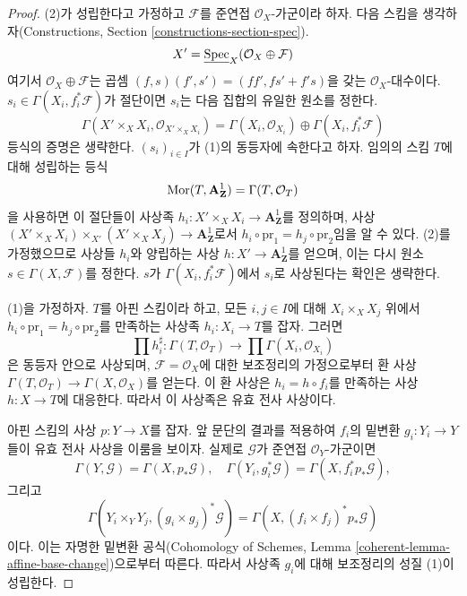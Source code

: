 \begin{proof}
(2)가 성립한다고 가정하고 $\mathcal{F}$를 준연접
$\mathcal{O}_X$-가군이라 하자. 다음 스킴을 생각하자(Constructions, Section
\ref{constructions-section-spec}).
$$
X' = \underline{\mathop{\mathrm{Spec}}}_X(\mathcal{O}_X \oplus \mathcal{F})
$$
여기서 $\mathcal{O}_X \oplus \mathcal{F}$는 곱셈
$(f, s)(f', s') = (ff', fs' + f's)$을 갖는
$\mathcal{O}_X$-대수이다.
$s_i \in \Gamma(X_i, f_i^*\mathcal{F})$가 절단이면 $s_i$는 다음 집합의
유일한 원소를 정한다.
$$
\Gamma(X' \times_X X_i, \mathcal{O}_{X' \times_X X_i}) =
\Gamma(X_i, \mathcal{O}_{X_i}) \oplus \Gamma(X_i, f_i^*\mathcal{F})
$$
등식의 증명은 생략한다.
$(s_i)_{i \in I}$가 (1)의 동등자에 속한다고 하자. 임의의 스킴 $T$에 대해
성립하는 등식
$$
\mathop{\mathrm{Mor}}\nolimits(T, \mathbf{A}^1_\mathbf{Z}) = \Gamma(T, \mathcal{O}_T)
$$
을 사용하면 이 절단들이 사상족
$h_i : X' \times_X X_i \to \mathbf{A}^1_\mathbf{Z}$를 정의하며,
사상 $(X' \times_X X_i) \times_{X'} (X' \times_X X_j) \to
\mathbf{A}^1_\mathbf{Z}$로서
$h_i \circ \text{pr}_1 = h_j \circ \text{pr}_2$임을 알 수 있다.
(2)를 가정했으므로 사상들 $h_i$와 양립하는 사상
$h : X' \to \mathbf{A}^1_\mathbf{Z}$를 얻으며, 이는 다시 원소
$s \in \Gamma(X, \mathcal{F})$를 정한다. $s$가
$\Gamma(X_i, f_i^*\mathcal{F})$에서 $s_i$로 사상된다는 확인은 생략한다.

\medskip\noindent
(1)을 가정하자. $T$를 아핀 스킴이라 하고, 모든 $i, j \in I$에 대해
$X_i \times_X X_j$ 위에서
$h_i \circ \text{pr}_1 = h_j \circ \text{pr}_2$를 만족하는 사상족
$h_i : X_i \to T$를 잡자. 그러면
$$
\prod h_i^\sharp :
\Gamma(T, \mathcal{O}_T)
\to
\prod \Gamma(X_i, \mathcal{O}_{X_i})
$$
은 동등자 안으로 사상되며, $\mathcal{F} = \mathcal{O}_X$에 대한 보조정리의
가정으로부터 환 사상
$\Gamma(T, \mathcal{O}_T) \to \Gamma(X, \mathcal{O}_X)$를 얻는다.
이 환 사상은 $h_i = h \circ f_i$를 만족하는 사상 $h : X \to T$에
대응한다. 따라서 이 사상족은 유효 전사 사상이다.

\medskip\noindent
아핀 스킴의 사상 $p : Y \to X$를 잡자. 앞 문단의 결과를 적용하여
$f_i$의 밑변환 $g_i : Y_i \to Y$들이 유효 전사 사상을 이룸을 보이자.
실제로 $\mathcal{G}$가 준연접 $\mathcal{O}_Y$-가군이면
$$
\Gamma(Y, \mathcal{G}) = \Gamma(X, p_*\mathcal{G}),\quad
\Gamma(Y_i, g_i^*\mathcal{G}) = \Gamma(X, f_i^*p_*\mathcal{G}),
$$
그리고
$$
\Gamma(Y_i \times_Y Y_j, (g_i \times g_j)^*\mathcal{G}) =
\Gamma(X, (f_i \times f_j)^*p_*\mathcal{G})
$$
이다. 이는 자명한 밑변환 공식(Cohomology of Schemes, Lemma
\ref{coherent-lemma-affine-base-change})으로부터 따른다.
따라서 사상족 $g_i$에 대해 보조정리의 성질 (1)이 성립한다.
\end{proof}

